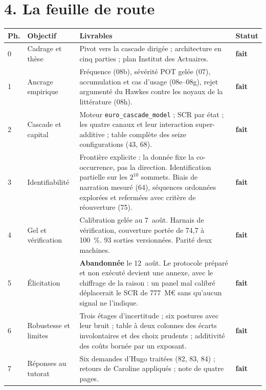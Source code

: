 \documentclass[11pt,a4paper]{article}
\newcommand{\fait}{\cellcolor{softgreen}\textbf{fait}}
\begin{document}
\section*{4. La feuille de route}

\begin{center}\footnotesize
\renewcommand{\arraystretch}{1.3}
\begin{tabular}{@{}p{0.4cm} p{3.9cm} p{8.8cm} p{1.5cm}@{}}
\toprule
\textbf{Ph.} & \textbf{Objectif} & \textbf{Livrables} & \textbf{Statut} \\
\midrule
0 & Cadrage et thèse & Pivot vers la cascade dirigée ; architecture en cinq parties ;
plan Institut des Actuaires. & \fait \\

1 & Ancrage empirique & Fréquence (08b), sévérité POT gelée (07), accumulation et cas d'usage
(08e--08g), rejet argumenté du Hawkes contre les noyaux de la littérature (08h). & \fait \\

2 & Cascade et capital & Moteur \texttt{euro\_cascade\_model} ; SCR par état ; les quatre canaux
et leur interaction super-additive ; table complète des seize configurations (43, 68). & \fait \\

3 & Identifiabilité & Frontière explicite : la donnée fixe la co-occurrence, pas la direction.
Identification partielle sur les $2^{10}$ sommets. Biais de narration mesuré (64), séquences
ordonnées explorées et refermées avec critère de réouverture (75). & \fait \\

4 & Gel et vérification & Calibration gelée au 7~août. Harnais de vérification, couverture
portée de 74,7 à 100~\%. 93 sorties versionnées. Parité deux machines. & \fait \\

5 & Élicitation & \textbf{Abandonnée} le 12~août. Le protocole préparé et non exécuté devient
une annexe, avec le chiffrage de la raison : un panel mal calibré déplacerait le SCR de
777~M\euro{} sans qu'aucun signal ne l'indique. & \fait \\

6 & Robustesse et limites & Trois étages d'incertitude ; six postures avec leur bruit ; table à
deux colonnes des écarts involontaires et des choix prudents ; additivité des coûts bornée par
un exposant. & \fait \\

7 & Réponses au tutorat & Six demandes d'Hugo traitées (82, 83, 84) ; retours de Caroline
appliqués ; note de quatre pages. & \fait \\


\end{tabular}
\end{center}
\end{document}
